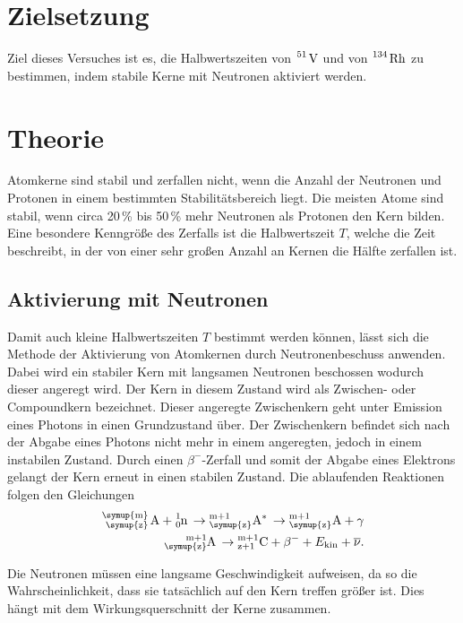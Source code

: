 \section{Zielsetzung}

Ziel dieses Versuches ist es, die Halbwertszeiten von $\ce{^51 V}$ und von $\ce{^134 Rh}$ zu bestimmen, indem stabile Kerne
mit Neutronen aktiviert werden.

\section{Theorie}
\label{sec:Theorie}
Atomkerne sind stabil und zerfallen nicht, wenn die Anzahl der Neutronen und Protonen in einem bestimmten 
Stabilitätsbereich liegt. Die meisten Atome sind stabil, wenn circa 20\,\% bis 50\,\% mehr Neutronen als Protonen den Kern bilden.
Eine besondere Kenngröße des Zerfalls ist die Halbwertszeit $T$, welche die Zeit beschreibt, in der von einer sehr großen Anzahl
an Kernen die Hälfte zerfallen ist.

\subsection{Aktivierung mit Neutronen}
Damit auch kleine Halbwertszeiten $T$ bestimmt werden können, lässt sich die Methode der Aktivierung von Atomkernen 
durch Neutronenbeschuss anwenden.
Dabei wird ein stabiler Kern mit langsamen Neutronen beschossen wodurch dieser angeregt wird. Der Kern in diesem Zustand 
wird als Zwischen- oder Compoundkern bezeichnet. Dieser angeregte Zwischenkern geht unter Emission eines Photons in einen Grundzustand
über. Der Zwischenkern befindet sich nach der Abgabe eines Photons nicht mehr in einem angeregten, jedoch in einem instabilen Zustand.
Durch einen $\beta^{-}$-Zerfall und somit der Abgabe eines Elektrons gelangt der Kern erneut in einen stabilen Zustand. Die ablaufenden 
Reaktionen folgen den Gleichungen
\begin{align*}
    \ce{^{\symup{m}}_{\symup{z}} A + ^{1}_0n \to ^{m{+1}}_{\symup{z}}{A^{*}} \to ^{m{+1}}_{\symup{z}}A} + \gamma\\
    \ce{^{m{+1}}_{\symup{z}}A \to ^{m{+1}}_{z{+1}}C }+ \beta ^{-} + E_{\text{kin}} + \overline{\nu}.
\end{align*}

Die Neutronen müssen eine langsame Geschwindigkeit aufweisen, da so die
Wahrscheinlichkeit, dass sie tatsächlich auf den Kern treffen größer ist. Dies hängt mit dem Wirkungsquerschnitt der Kerne
zusammen.


